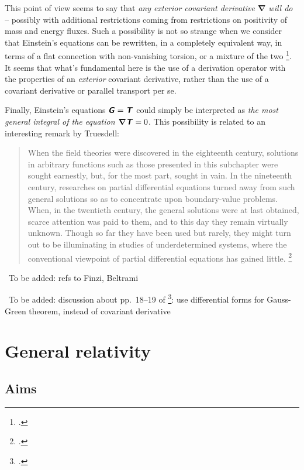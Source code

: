 \documentclass[\ifafour a4paper,12pt,\else a5paper,10pt,\fi%
onecolumn,oneside,article,%
british%
]{memoir}
\theoremstyle{remark}
\theoremstyle{innote}
\newcommand*{\mathte}[1]{\textbf{\textit{\textsf{#1}}}}
\newcommand*{\citep}{\footcites}
\renewcommand*{\|}[1][]{\nonscript\,#1\vert\nonscript\;\mathopen{}}
\newcommand*{\puzzle}{{\fontencoding{U}\fontfamily{fontawesometwo}\selectfont\symbol{225}}}
\newcommand{\mynote}[1]{ {\color{notecolour}\puzzle\ #1}}
\newcommand*{\yEii}{G}
\newcommand*{\yEi}{\mathte{\yEii}}
\newcommand*{\yTTf}{T}
\newcommand*{\yTf}{\mathte{\yTTf}}
\newcommand*{\yDi}{\bm{\nabla}}
\begin{document}
This point of view seems to say that \emph{any exterior covariant
  derivative $\yDi$ will do} -- possibly with additional restrictions
coming from restrictions on positivity of mass and energy fluxes. Such a
possibility is not so strange when we consider that Einstein's equations
can be rewritten, in a completely equivalent way, in terms of a flat
connection with non-vanishing torsion, or a mixture of the two
\citep{deandradeetal2000,arcosetal2004,aldrovandietal2013,pereira2014,caietal2016}.
It seems that what's fundamental here is the use of a derivation operator
with the properties of an \emph{exterior} covariant derivative, rather than
the use of a covariant derivative or parallel transport per se.

Finally, Einstein's equations $\yEi = \yTf$ could simply be interpreted as
\emph{the most general integral of the equation $\yDi\yTf = 0$}. This
possibility is related to an interesting remark by Truesdell:
\begin{quote}
  When the field theories were discovered in the eighteenth century, solutions
in arbitrary functions such as those presented in this subchapter were sought
earnestly, but, for the most part, sought in vain. In the nineteenth century,
researches on partial differential equations turned away from such general
solutions so as to concentrate upon boundary-value problems. When, in the
twentieth century, the general solutions were at last obtained, scarce attention
was paid to them, and to this day they remain virtually unknown. Though
so far they have been used but rarely, they might turn out to be illuminating
in studies of underdetermined systems, where the conventional viewpoint of
partial differential equations has gained little.  \citep[p.~594]{truesdelletal1960}
\end{quote}

\mynote{To be added: refs to Finzi, Beltrami}

\mynote{To be added: discussion about pp.~18--19 of \citep{weatherall2017}:
  use differential forms for Gauss-Green theorem, instead of covariant
  derivative}



\section{General relativity}
\label{sec:general_relativity}

\subsection{Aims}
\label{sec:aims_general_rel}
\end{document}
